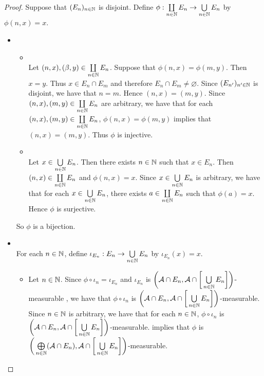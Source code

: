 \documentclass{book}
\begin{document}
	\begin{proof} 
		Suppose that $(E_n)_{n \in \mathbb{N}}$ is disjoint. Define $\phi: \coprod\limits_{n \in \mathbb{N}} E_n \rightarrow \bigcup\limits_{n \in \mathbb{N}} E_n$ by $\phi(n, x) = x$. 
		\begin{itemize}
			\item {} \\
			\begin{itemize}
				\item {} \\
				Let $(n, x), (\beta, y) \in \coprod\limits_{n \in \mathbb{N}} E_n$. Suppose that $\phi(n, x) =  \phi(m, y)$. Then $x = y$. Thus $x \in E_n \cap E_{m}$ and therefore $E_n \cap E_{m} \neq \varnothing$. Since $(E_{n'})_{n' \in \mathbb{N}}$ is disjoint, we have that $n = m$. Hence $(n, x) = (m, y)$. Since $(n, x), (m, y) \in \coprod\limits_{n \in \mathbb{N}} E_n$ are arbitrary, we have that for each $(n, x), (m, y) \in \coprod\limits_{n \in \mathbb{N}} E_n$, $\phi(n, x) =  \phi(m, y)$ implies that $(n, x) = (m, y)$. Thus $\phi$ is injective. 
				\item {} \\
				Let $x \in \bigcup\limits_{n \in \mathbb{N}} E_n$. Then there exists $n \in \mathbb{N}$ such that $x \in E_n$. Then $(n, x) \in \coprod\limits_{n \in \mathbb{N}} E_n$ and $\phi(n, x) = x$. Since $x \in \bigcup\limits_{n \in \mathbb{N}} E_n$ is arbitrary, we have that for each $x \in \bigcup\limits_{n \in \mathbb{N}} E_n$, there exists $a \in \coprod\limits_{n \in \mathbb{N}} E_n$ such that $\phi(a) = x$. Hence $\phi$ is surjective.
			\end{itemize}
			So $\phi$ is a bijection.
			\item {} \\
			For each $n \in \mathbb{N}$, define $\iota_{E_n}: E_n \rightarrow \bigcup\limits_{n \in \mathbb{N}} E_n$ by $\iota_{E_n}(x) = x$. 
			\begin{itemize}
				\item Let $n \in \mathbb{N}$. Since $\phi \circ \iota_n = \iota_{E_n}$ and $\iota_{E_n}$ is $\bigg( \mathcal{A} \cap E_n, \mathcal{A} \cap \bigg[ \bigcup\limits_{n \in \mathbb{N}} E_n \bigg] \bigg)$-measurable , we have that $\phi \circ \iota_n$ is $\bigg( \mathcal{A} \cap E_n, \mathcal{A} \cap \bigg[ \bigcup\limits_{n \in \mathbb{N}} E_n \bigg] \bigg)$-measurable. Since $n \in \mathbb{N}$ is arbitrary, we have that for each $n \in \mathbb{N}$, $\phi \circ \iota_n$ is $\bigg( \mathcal{A} \cap E_n, \mathcal{A} \cap \bigg[ \bigcup\limits_{n \in \mathbb{N}} E_n \bigg] \bigg)$-measurable.  implies that $\phi$ is $\bigg( \bigoplus\limits_{n \in \mathbb{N}} (\mathcal{A} \cap E_n), \mathcal{A} \cap \bigg[ \bigcup\limits_{n \in \mathbb{N}} E_n \bigg] \bigg)$-measurable. 

\end{itemize}
\end{itemize}
\end{proof}
\end{document}
